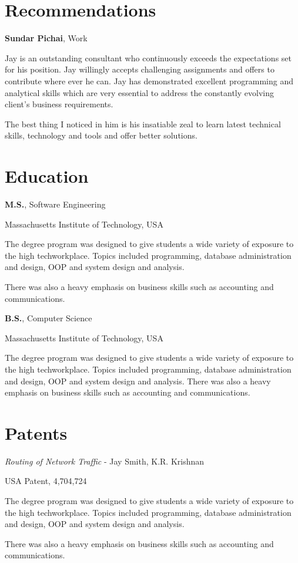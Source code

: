 \documentclass[11pt]{article}
\begin{document}
\section*{Recommendations}
%
\begin{cvitem}
	\textbf{Sundar Pichai}, Work \par
	Jay is an outstanding consultant who continuously exceeds the expectations set for his position. Jay willingly
    accepts challenging assignments and offers to contribute where ever he can. Jay has demonstrated excellent
    programming and analytical skills which are very essential to address the constantly evolving client's
    business requirements.
	
	The best thing I noticed in him is his insatiable zeal to learn latest technical skills, technology %
    and tools and offer better solutions.
\end{cvitem}%
\section*{Education}
%
\begin{cvitem}
	\textbf{M.S.}, Software Engineering\par
	Massachusetts Institute of Technology, USA \par
	The degree program was designed to give students a wide variety of exposure to the high techworkplace.
    Topics included programming, database administration and design, OOP and system design and analysis.
	
	There was also a heavy emphasis on business skills such as accounting and communications.
    \par
\end{cvitem}%
\begin{cvitem}
	\textbf{B.S.}, Computer Science \par
	Massachusetts Institute of Technology, USA \par
	The degree program was designed to give students a wide variety of exposure to the high techworkplace.
    Topics included programming, database administration and design, OOP and system design and analysis.
    There was also a heavy emphasis on business skills such as accounting and communications.
\end{cvitem}%
\section*{Patents}
%
\begin{cvitem}
	\textit{Routing of Network Traffic} - Jay Smith, K.R. Krishnan \par
	USA Patent, 4,704,724 \par
	The degree program was designed to give students a wide variety of exposure to the high techworkplace.
    Topics
    included programming, database administration and design, OOP and system design and analysis.
	
	There was also a heavy emphasis on business skills such as accounting and communications.
\end{cvitem}%
\end{document}
